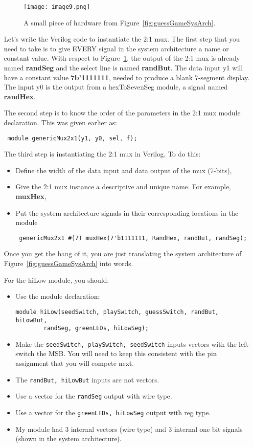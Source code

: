 \begin{figure}[ht]
\texttt{[image: image9.png]}
\caption{A small piece of hardware from Figure~\ref{fig:guessGameSysArch}.}
\label{fig:snippetFromSysArch}
\end{figure}

Let's write the Verilog code to instantiate the 2:1 mux.
The first step that you need to take is to give EVERY signal in the
system architecture a name or constant value. With respect to Figure~\ref{fig:snippetFromSysArch},
the output of the 2:1 mux is already named \textbf{randSeg} and the
select line is named \textbf{randBut}. The data input y1 will have a
constant value \textbf{7b'1111111}, needed to produce a blank 7-segment
display. The input y0 is the output from a hexToSevenSeg module, a signal
named \textbf{randHex}.

The second step is to know the order of the parameters in the 2:1 mux
module declaration. This was given earlier as:

\verb+ module genericMux2x1(y1, y0, sel, f); +

The third step is instantiating the 2:1 mux in Verilog. To do this:

\begin{itemize}
\item
Define the width of the data input and data output of the mux
(7-bits),
\item
Give the 2:1 mux instance a descriptive and unique name.
For example, \textbf{muxHex},
\item
Put the system architecture signals in their corresponding locations
in the module

\verb+ genericMux2x1 #(7) muxHex(7'b1111111, RandHex, randBut, randSeg); +
\end{itemize}

Once you get the hang of it, you are just translating the system
architecture of Figure~\ref{fig:guessGameSysArch} into words.

For the hiLow module, you should:

\begin{itemize}
\item
Use the module declaration:

\begin{verbatim}
module hiLow(seedSwitch, playSwitch, guessSwitch, randBut, hiLowBut,
        randSeg, greenLEDs, hiLowSeg);
\end{verbatim}

\item
Make the \verb+seedSwitch, playSwitch, seedSwitch+ inputs vectors with the
left switch the MSB. You will need to keep this consistent with the
pin assignment that you will compete next.
\item
The \verb+randBut, hiLowBut+ inputs are not vectors.
\item
Use a vector for the \verb+randSeg+ output with wire type.
\item
Use a vector for the \verb+greenLEDs, hiLowSeg+ output with reg type.
\item
My module had 3 internal vectors (wire type) and 3 internal one bit
signals (shown in the system architecture).
\end{itemize}

